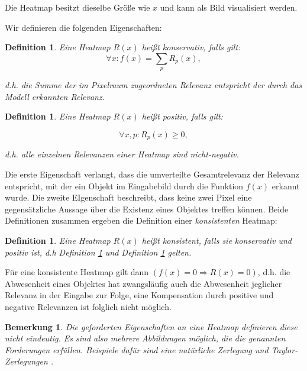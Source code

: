 \documentclass[twoside, 11pt,a4paper]{article}
\def\emph#1{\textit{#1}}
\newtheorem{definition}[theorem]{Definition}
\newtheorem{remark}[theorem]{Bemerkung}
\numberwithin{equation}{section}
\begin{document}
	Die Heatmap besitzt dieselbe Größe wie $x$ und kann als Bild visualisiert werden.
	
	Wir definieren die folgenden Eigenschaften:
	
	\begin{definition}\label{def_konservativ}
		Eine Heatmap $R(x)$ heißt \emph{konservativ}, falls gilt:
		\begin{equation}
		\forall x: f(x) = \sum_p R_p(x),
		\end{equation}
		
		d.h. die Summe der im Pixelraum zugeordneten Relevanz entspricht der durch das Modell erkannten Relevanz.
	\end{definition}
	
	
	\begin{definition} \label{def_pos}
		Eine Heatmap $R(x)$ heißt \emph{positiv}, falls gilt:
		
		\begin{equation}
		\forall x,p: R_p(x) \geq 0,
		\end{equation}
		
		d.h. alle einzelnen Relevanzen einer Heatmap sind nicht-negativ.
		
	\end{definition}
	
	Die erste Eigenschaft verlangt, dass die umverteilte Gesamtrelevanz der Relevanz entspricht, mit der ein Objekt im Eingabebild durch die Funktion $f(x)$ erkannt wurde.
	Die zweite EIgenschaft beschreibt, dass keine zwei Pixel eine gegensätzliche Aussage über die Existenz eines Objektes treffen können. Beide Definitionen zusammen ergeben die Definition einer \textit{konsistenten} Heatmap:
	
	\begin{definition}
		Eine Heatmap $R(x)$ heißt \emph{konsistent}, falls sie konservativ und positiv ist, d.h Definition \ref{def_konservativ} und Definition \ref{def_pos} gelten.
	\end{definition}
	
	Für eine konsistente Heatmap gilt dann $(f(x) = 0 \Rightarrow R(x) = 0)$, d.h. die Abwesenheit eines Objektes hat zwangsläufig auch die Abwesenheit jeglicher Relevanz in der Eingabe zur Folge, eine Kompensation durch positive und negative Relevanzen ist folglich nicht möglich.
	
	\begin{remark}
		Die geforderten Eigenschaften an eine Heatmap definieren diese nicht eindeutig. Es sind also mehrere Abbildungen möglich, die die genannten Forderungen erfüllen. Beispiele dafür sind eine natürliche Zerlegung und Taylor-Zerlegungen \cite{dtd_paper}.
	\end{remark}
	
\end{document}
